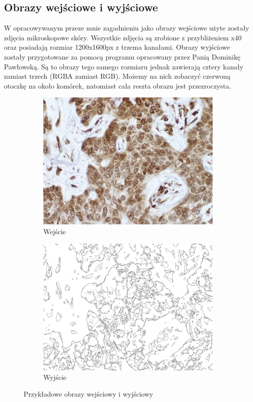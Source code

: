 \documentclass{article}
\begin{document}
\subsection{Obrazy wejściowe i wyjściowe}
W opracowywanym przeze mnie zagadnieniu jako obrazy wejściowe użyte zostały zdjęcia mikroskopowe skóry.
Wszystkie zdjęcia są zrobione z przybliżeniem x40 oraz posiadają rozmiar 1200x1600px z trzema kanałami.
Obrazy wyjściowe zostały przygotowane za pomocą programu opracowany przez Panią Dominikę Pawłowską.
Są to obrazy tego samego rozmiaru jednak zawierają cztery kanały zamiast trzech (RGBA zamiast RGB).
Możemy na nich zobaczyć czerwoną otoczkę na około komórek, natomiast cała reszta obrazu jest przezroczysta.
\begin{figure}[H]
    \centering
    \begin{subfigure}{0.4\linewidth}
        \includegraphics[width=\linewidth]{images/input.png}
        \caption{Wejście}
    \end{subfigure}
    \begin{subfigure}{0.4\linewidth}
        \includegraphics[width=\linewidth]{images/output.jpg}
        \caption{Wyjście}
    \end{subfigure}
    \caption{Przykładowe obrazy wejściowy i wyjściowy}
    \label{fig:input_and_output}
\end{figure}
\newpage
\end{document}
